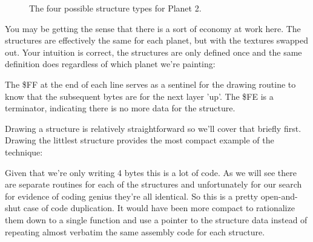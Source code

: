 \begin{figure}[H]
  {
    \setlength{\tabcolsep}{3.0pt}
    \setlength\cmidrulewidth{\heavyrulewidth} %
    \begin{adjustbox}{width=15cm,center}
      \begin{subfigure}{0.3\textwidth}
        
      \end{subfigure}
      \begin{subfigure}{0.3\textwidth}
        
      \end{subfigure}
      \begin{subfigure}{0.3\textwidth}
        
      \end{subfigure}
      \begin{subfigure}{0.3\textwidth}
        
      \end{subfigure}
    \end{adjustbox}
  }\caption[]{The four possible structure types for Planet 2.}
\end{figure}

You may be getting the sense that there is a sort of economy at work here. The structures are effectively
the same for each planet, but with the textures swapped out. Your intuition is correct, the structures
are only defined once and the same definition does regardless of which planet we're painting:

%


The \$FF at the end of each line serves as a sentinel for the drawing routine to know that the subsequent bytes
are for the next layer 'up'. The \$FE is a terminator, indicating there is no more data for the structure.

Drawing a structure is relatively straightforward so we'll cover that briefly first. Drawing the littlest
structure provides the most compact example of the technique:

%


Given that we're only writing 4 bytes this is a lot of code. As we will see there are separate routines for each
of the structures and unfortunately for our search for evidence of coding genius they're all identical. So this
is a pretty open-and-shut case of code duplication. It would have been more compact to rationalize them down to a single function
and use a pointer to the structure data instead of repeating almost verbatim the same assembly code for each
structure. 

